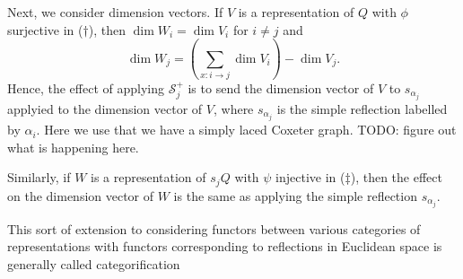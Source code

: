 Next, we consider dimension vectors. If $V$ is a representation of $Q$ with
$\phi$ surjective in ($\dagger$), then $\dim W_i = \dim V_i$ for $i\neq j$
and
\[ \dim W_j = \left(\sum_{x\colon i\to j}\dim V_i\right) - \dim V_j. \]
Hence, the effect of applying $\mathcal{S}_j^+$ is to send the dimension vector
of $V$ to $s_{\alpha_j}$ applyied to the dimension vector of $V$, where
$s_{\alpha_j}$ is the simple reflection labelled by $\alpha_i$. Here we use
that we have a simply laced Coxeter graph. TODO: figure out what is happening
here.

Similarly, if $W$ is a representation of $s_jQ$ with $\psi$ injective
in ($\ddagger$), then the effect on the dimension vector of $W$ is the same as
applying the simple reflection $s_{\alpha_j}$.

This sort of extension to considering functors between various categories of
representations with functors corresponding to reflections in Euclidean space
is generally called categorification
